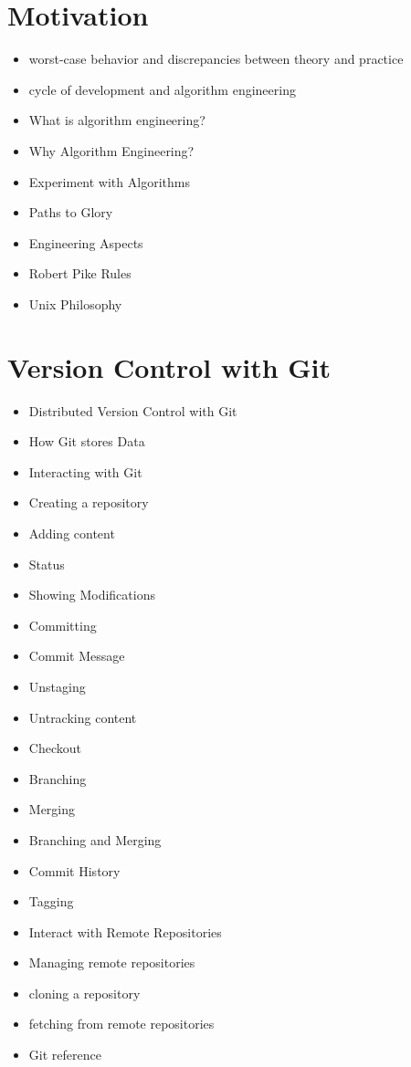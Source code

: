 \documentclass[8pt,a4paper,fleqn]{article}
\begin{document}
\begin{multicols}{2}
  \section{Motivation} %
  \label{sec:motivation}
  \begin{itemize}
    \item worst-case behavior and discrepancies between theory and practice
    \item cycle of development and algorithm engineering
    \item What is algorithm engineering?
    \item Why Algorithm Engineering?
    \item Experiment with Algorithms
    \item Paths to Glory
    \item Engineering Aspects
    \item Robert Pike Rules
    \item Unix Philosophy
  \end{itemize}

  \section{Version Control with Git} %
  \label{sec:version_control_with_git}
  \begin{itemize}
    \item Distributed Version Control with Git
    \item How Git stores Data
    \item Interacting with Git
    \item Creating a repository
    \item Adding content
    \item Status
    \item Showing Modifications
    \item Committing
    \item Commit Message
    \item Unstaging
    \item Untracking content
    \item Checkout
    \item Branching
    \item Merging
    \item Branching and Merging
    \item Commit History
    \item Tagging
    \item Interact with Remote Repositories
    \item Managing remote repositories
    \item cloning a repository
    \item fetching from remote repositories
    \item Git reference
  \end{itemize}


\end{multicols}
\end{document}
